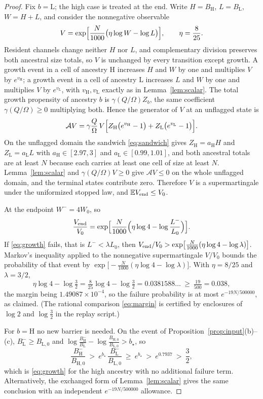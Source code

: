 \documentclass[11pt,a4paper]{article}
\theoremstyle{plain}
\theoremstyle{definition}
\theoremstyle{remark}
\newcommand{\E}{\mathbb E}
\newcommand{\lo}{\mathrm L}
\newcommand{\hi}{\mathrm H}
\newcommand{\gen}{\mathcal A}
\begin{document}
\begin{proof}
Fix $b=\lo$; the high case is treated at the end. Write $H=B_\hi$, $L=B_\lo$,
$W=H+L$, and consider the nonnegative observable
\begin{equation}\label{eq:Vgrowth}
V=\exp\Bigl[\frac N{1000}\bigl(\eta\log W-\log L\bigr)\Bigr],\qquad\eta=\frac8{25}.
\end{equation}
Resident channels change neither $H$ nor $L$, and complementary division
preserves both ancestral size totals, so $V$ is unchanged by every transition
except growth. A growth event in a cell of ancestry $\hi$ increases $H$ and $W$
by one and multiplies $V$ by $e^{v_\hi}$; a growth event in a cell of ancestry
$\lo$ increases $L$ and $W$ by one and multiplies $V$ by $e^{v_\lo}$, with
$v_\hi,v_\lo$ exactly as in Lemma~\ref{lem:scalar}. The total growth propensity
of ancestry $b$ is $\gamma(Q/\Omega)Z_b$, the same coefficient
$\gamma(Q/\Omega)\ge0$ multiplying both. Hence the generator of $V$ at an
unflagged state is
\[
\gen V=\gamma\frac Q\Omega\,V\Bigl[Z_\hi\bigl(e^{v_\hi}-1\bigr)
+Z_\lo\bigl(e^{v_\lo}-1\bigr)\Bigr].
\]
On the unflagged domain the sandwich \eqref{eq:sandwich} gives
$Z_\hi=a_\hi H$ and $Z_\lo=a_\lo L$ with $a_\hi\in[2.97,3]$ and
$a_\lo\in[0.99,1.01]$, and both ancestral totals are at least $N$ because each
carries at least one cell of size at least $N$. Lemma~\ref{lem:scalar} and
$\gamma(Q/\Omega)V\ge0$ give $\gen V\le0$ on the whole unflagged domain, and
the terminal states contribute zero. Therefore $V$ is a supermartingale under
the uniformized stopped law, and $\E V_{\rm end}\le V_0$.

At the endpoint $W^-=4W_0$, so
\[
\frac{V_{\rm end}}{V_0}
=\exp\Bigl[\frac N{1000}\Bigl(\eta\log4-\log\frac{L^-}{L_0}\Bigr)\Bigr].
\]
If \eqref{eq:growth} fails, that is $L^-<\lambda L_0$, then
$V_{\rm end}/V_0>\exp\bigl[\frac N{1000}(\eta\log4-\log\lambda)\bigr]$. Markov's
inequality applied to the nonnegative supermartingale $V/V_0$ bounds the
probability of that event by
$\exp\bigl[-\frac N{1000}(\eta\log4-\log\lambda)\bigr]$. With $\eta=8/25$ and
$\lambda=3/2$,
\begin{equation}\label{eq:margin}
\eta\log4-\log\tfrac32=\tfrac8{25}\log4-\log\tfrac32
=0.0381588\ldots\ \ge\ \tfrac{19}{500}=0.038,
\end{equation}
the margin being $1.49087\times10^{-4}$, so the failure probability is at most
$e^{-19N/500000}$, as claimed. (The rational comparison \eqref{eq:margin} is
certified by enclosures of $\log2$ and $\log\frac32$ in the replay script.)

For $b=\hi$ no new barrier is needed. On the event of
Proposition~\ref{prop:input}(b)--(c), $B_\lo^-\ge B_{\lo,0}$ and
$\log\frac{B_\hi^-}{B_\lo^-}-\log\frac{B_{\hi,0}}{B_{\lo,0}}>b_\star$, so
\[
\frac{B_\hi^-}{B_{\hi,0}}\ >\ e^{b_\star}\,\frac{B_\lo^-}{B_{\lo,0}}\ \ge\
e^{b_\star}\ >\ e^{0.7937}\ >\ \frac32 ,
\]
which is \eqref{eq:growth} for the high ancestry with no additional failure
term. Alternatively, the exchanged form of Lemma~\ref{lem:scalar} gives the
same conclusion with an independent $e^{-19N/500000}$ allowance.
\end{proof}
\end{document}
